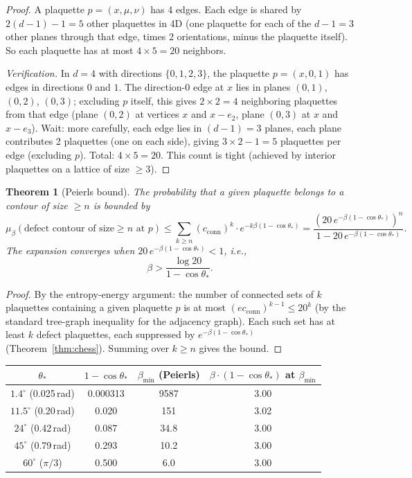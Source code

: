 \documentclass[11pt]{article}
\newtheorem{theorem}{Theorem}[section]
\theoremstyle{definition}
\begin{document}
\begin{proof}
A plaquette $p=(x,\mu,\nu)$ has 4 edges.  Each edge is shared by
$2(d-1)-1=5$ other plaquettes in 4D (one plaquette for each of the
$d-1=3$ other planes through that edge, times 2 orientations, minus
the plaquette itself).  So each plaquette has at most $4\times 5=20$
neighbors.

\emph{Verification.}  In $d=4$ with directions $\{0,1,2,3\}$,
the plaquette $p=(x,0,1)$ has edges in directions
$0$ and $1$.  The direction-$0$ edge at $x$ lies in planes
$(0,1)$, $(0,2)$, $(0,3)$; excluding $p$ itself, this gives
$2\times 2=4$ neighboring plaquettes from that edge
(plane $(0,2)$ at vertices $x$ and $x-e_2$,
plane $(0,3)$ at $x$ and $x-e_3$).
Wait: more carefully, each edge lies in $(d-1)=3$ planes,
each plane contributes 2 plaquettes (one on each side),
giving $3\times 2-1=5$ plaquettes per edge (excluding $p$).
Total: $4\times 5=20$.
This count is tight (achieved by interior plaquettes on
a lattice of size $\ge 3$).
\end{proof}

\begin{theorem}[Peierls bound]\label{thm:peierls}
The probability that a given plaquette belongs to a contour of size
$\ge n$ is bounded by
\begin{equation}
\mu_\beta(\text{defect contour of size}\ge n\text{ at }p)
\le\sum_{k\ge n}(c_{\mathrm{conn}})^k\cdot
e^{-k\beta(1-\cos\theta_*)}
=\frac{(20\,e^{-\beta(1-\cos\theta_*)})^n}
{1-20\,e^{-\beta(1-\cos\theta_*)}}.
\end{equation}
The expansion converges when
$20\,e^{-\beta(1-\cos\theta_*)}<1$, i.e.,
\begin{equation}
\beta>\frac{\log 20}{1-\cos\theta_*}.
\end{equation}
\end{theorem}

\begin{proof}
By the entropy-energy argument: the number of connected sets of $k$
plaquettes containing a given plaquette $p$ is at most
$(ec_{\mathrm{conn}})^{k-1}\le 20^k$ (by the standard tree-graph
inequality for the adjacency graph).  Each such set has at least $k$
defect plaquettes, each suppressed by $e^{-\beta(1-\cos\theta_*)}$
(Theorem~\ref{thm:chess}).  Summing over $k\ge n$ gives the bound.
\end{proof}

\begin{center}
\begin{tabular}{cccc}
\toprule
$\theta_*$ & $1-\cos\theta_*$ & $\beta_{\min}$ (Peierls) &
$\beta\cdot(1-\cos\theta_*)$ at $\beta_{\min}$\\
\midrule
$1.4^\circ$ (0.025\,rad) & 0.000313 & 9587 & 3.00\\
$11.5^\circ$ (0.20\,rad) & 0.020 & 151 & 3.02\\
$24^\circ$ (0.42\,rad) & 0.087 & 34.8 & 3.00\\
$45^\circ$ (0.79\,rad) & 0.293 & 10.2 & 3.00\\
$60^\circ$ ($\pi/3$) & 0.500 & 6.0 & 3.00\\
\bottomrule
\end{tabular}
\end{center}
\end{document}
